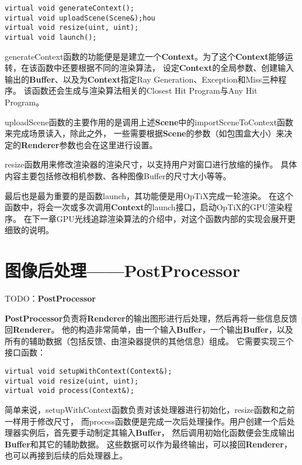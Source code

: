 \lstset{language=C++}
\begin{lstlisting}
virtual void generateContext();
virtual void uploadScene(Scene&);hou
virtual void resize(uint, uint);
virtual void launch();
\end{lstlisting}

generateContext函数的功能便是是建立一个\textbf{Context}。为了这个\textbf{Context}能够运转，在该函数中还要根据不同的渲染算法，
设定\textbf{Context}的全局参数、创建输入输出的\textbf{Buffer}、以及为\textbf{Context}指定Ray Generation、Exception和Miss三种程序。
该函数还会生成与渲染算法相关的Closest Hit Program与Any Hit Program。

uploadScene函数的主要作用的是调用上述\textbf{Scene}中的importSceneToContext函数来完成场景读入，除此之外，
一些需要根据\textbf{Scene}的参数（如包围盒大小）来决定的\textbf{Renderer}参数也会在这里进行设置。

resize函数用来修改渲染器的渲染尺寸，以支持用户对窗口进行放缩的操作。
具体内容主要包括修改相机参数、各种图像Buffer的尺寸大小等等。

最后也是最为重要的是函数launch，其功能便是用OpTiX完成一轮渲染。
在这个函数中，将会一次或多次调用\textbf{Context}的launch接口，启动OpTiX的GPU渲染程序。
在下一章GPU光线追踪渲染算法的介绍中，对这个函数内部的实现会展开更细致的说明。

\section{图像后处理——PostProcessor}

TODO：\textbf{PostProcessor}

\textbf{PostProcessor}负责将\textbf{Renderer}的输出图形进行后处理，然后再将一些信息反馈回\textbf{Renderer}。
他的构造非常简单，由一个输入\textbf{Buffer}，一个输出\textbf{Buffer}，以及所有的辅助数据（包括反馈、由渲染器提供的其他信息）组成。
它需要实现三个接口函数：

\lstset{language=C++}
\begin{lstlisting}
virtual void setupWithContext(Context&);
virtual void resize(uint, uint);
virtual void process(Context&);
\end{lstlisting}

简单来说，setupWithContext函数负责对该处理器进行初始化，resize函数和之前一样用于修改尺寸，
而process函数便是完成一次后处理操作。用户创建一个后处理器实例后，首先要手动制定其输入\textbf{Buffer}，
然后调用初始化函数便会生成输出\textbf{Buffer}和其它的辅助数据。
这些数据可以作为最终输出，可以接回\textbf{Renderer}，也可以再接到后续的后处理器上。

